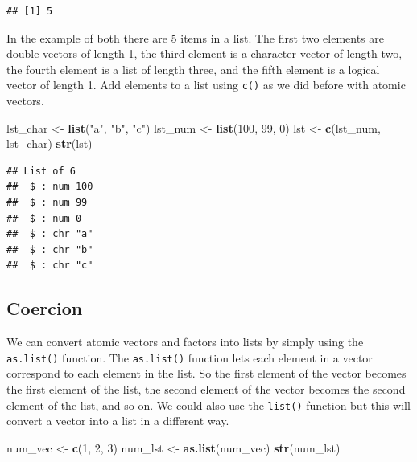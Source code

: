\documentclass[
]{book}
\newenvironment{Shaded}{\begin{snugshade}}{\end{snugshade}}
\newcommand{\DecValTok}[1]{\textcolor[rgb]{0.00,0.00,0.81}{#1}}
\newcommand{\KeywordTok}[1]{\textcolor[rgb]{0.13,0.29,0.53}{\textbf{#1}}}
\newcommand{\NormalTok}[1]{#1}
\newcommand{\StringTok}[1]{\textcolor[rgb]{0.31,0.60,0.02}{#1}}
\begin{document}
\begin{verbatim}
## [1] 5
\end{verbatim}

In the example of both there are 5 items in a list. The first two elements are double vectors of length 1, the third element is a character vector of length two, the fourth element is a list of length three, and the fifth element is a logical vector of length 1.
Add elements to a list using \texttt{c()} as we did before with atomic vectors.

\begin{Shaded}
\begin{Highlighting}[]
\NormalTok{lst_char <-}\StringTok{ }\KeywordTok{list}\NormalTok{(}\StringTok{"a"}\NormalTok{,}
    \StringTok{"b"}\NormalTok{, }\StringTok{"c"}\NormalTok{)}
\NormalTok{lst_num <-}\StringTok{ }\KeywordTok{list}\NormalTok{(}\DecValTok{100}\NormalTok{,}
    \DecValTok{99}\NormalTok{, }\DecValTok{0}\NormalTok{)}
\NormalTok{lst <-}\StringTok{ }\KeywordTok{c}\NormalTok{(lst_num, lst_char)}
\KeywordTok{str}\NormalTok{(lst)}
\end{Highlighting}
\end{Shaded}

\begin{verbatim}
## List of 6
##  $ : num 100
##  $ : num 99
##  $ : num 0
##  $ : chr "a"
##  $ : chr "b"
##  $ : chr "c"
\end{verbatim}

\hypertarget{coercion-2}{%
\subsection{Coercion}\label{coercion-2}}

We can convert atomic vectors and factors into lists by simply using the \texttt{as.list()} function. The \texttt{as.list()} function lets each element in a vector correspond to each element in the list. So the first element of the vector becomes the first element of the list, the second element of the vector becomes the second element of the list, and so on. We could also use the \texttt{list()} function but this will convert a vector into a list in a different way.

\begin{Shaded}
\begin{Highlighting}[]
\NormalTok{num_vec <-}\StringTok{ }\KeywordTok{c}\NormalTok{(}\DecValTok{1}\NormalTok{, }\DecValTok{2}\NormalTok{, }\DecValTok{3}\NormalTok{)}
\NormalTok{num_lst <-}\StringTok{ }\KeywordTok{as.list}\NormalTok{(num_vec)}
\KeywordTok{str}\NormalTok{(num_lst)}
\end{Highlighting}
\end{Shaded}
\end{document}
